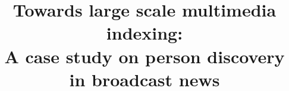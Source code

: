 \documentclass[10pt,conference,a4paper]{IEEEtran}
\begin{document}
%

\title{Towards large scale multimedia indexing: \\ A case study on person discovery in broadcast news}
%

\author{}

\maketitle






%



%














{%

}

%
\end{document}
